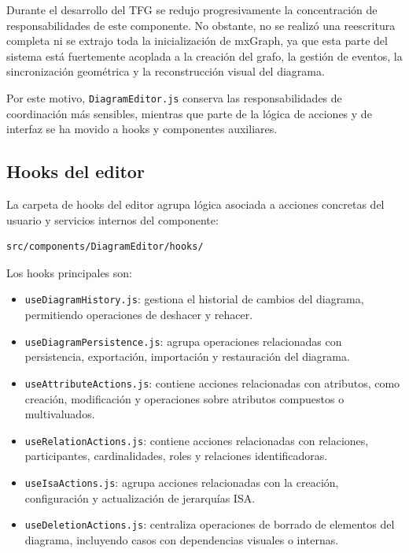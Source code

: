 Durante el desarrollo del TFG se redujo progresivamente la concentración de responsabilidades de este componente. No obstante, no se realizó una reescritura completa ni se extrajo toda la inicialización de mxGraph, ya que esta parte del sistema está fuertemente acoplada a la creación del grafo, la gestión de eventos, la sincronización geométrica y la reconstrucción visual del diagrama.

Por este motivo, \texttt{DiagramEditor.js} conserva las responsabilidades de coordinación más sensibles, mientras que parte de la lógica de acciones y de interfaz se ha movido a hooks y componentes auxiliares.

\subsection{Hooks del editor}

La carpeta de hooks del editor agrupa lógica asociada a acciones concretas del usuario y servicios internos del componente:

\begin{verbatim}
src/components/DiagramEditor/hooks/
\end{verbatim}

Los hooks principales son:

\begin{itemize}
\item \texttt{useDiagramHistory.js}: gestiona el historial de cambios del diagrama, permitiendo operaciones de deshacer y rehacer.

\item \texttt{useDiagramPersistence.js}: agrupa operaciones relacionadas con persistencia, exportación, importación y restauración del diagrama.

\item \texttt{useAttributeActions.js}: contiene acciones relacionadas con atributos, como creación, modificación y operaciones sobre atributos compuestos o multivaluados.

\item \texttt{useRelationActions.js}: contiene acciones relacionadas con relaciones, participantes, cardinalidades, roles y relaciones identificadoras.

\item \texttt{useIsaActions.js}: agrupa acciones relacionadas con la creación, configuración y actualización de jerarquías ISA.

\item \texttt{useDeletionActions.js}: centraliza operaciones de borrado de elementos del diagrama, incluyendo casos con dependencias visuales o internas.

\end{itemize}

